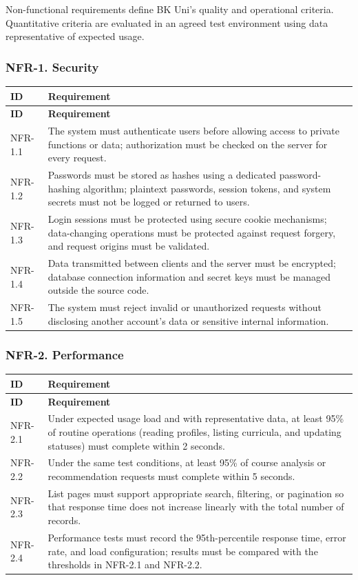 Non-functional requirements define BK Uni's quality and operational criteria. Quantitative criteria are evaluated in an agreed test environment using data representative of expected usage.

\subsubsection{NFR-1. Security}
\begin{longtable}{|p{}|p{}|}
\hline
\textbf{ID} & \textbf{Requirement} \\
\hline
\endfirsthead
\hline
\textbf{ID} & \textbf{Requirement} \\
\hline
\endhead
NFR-1.1 & The system must authenticate users before allowing access to private functions or data; authorization must be checked on the server for every request. \\
\hline
NFR-1.2 & Passwords must be stored as hashes using a dedicated password-hashing algorithm; plaintext passwords, session tokens, and system secrets must not be logged or returned to users. \\
\hline
NFR-1.3 & Login sessions must be protected using secure cookie mechanisms; data-changing operations must be protected against request forgery, and request origins must be validated. \\
\hline
NFR-1.4 & Data transmitted between clients and the server must be encrypted; database connection information and secret keys must be managed outside the source code. \\
\hline
NFR-1.5 & The system must reject invalid or unauthorized requests without disclosing another account's data or sensitive internal information. \\
\hline
\end{longtable}

\subsubsection{NFR-2. Performance}
\begin{longtable}{|p{}|p{}|}
\hline
\textbf{ID} & \textbf{Requirement} \\
\hline
\endfirsthead
\hline
\textbf{ID} & \textbf{Requirement} \\
\hline
\endhead
NFR-2.1 & Under expected usage load and with representative data, at least 95\% of routine operations (reading profiles, listing curricula, and updating statuses) must complete within 2 seconds. \\
\hline
NFR-2.2 & Under the same test conditions, at least 95\% of course analysis or recommendation requests must complete within 5 seconds. \\
\hline
NFR-2.3 & List pages must support appropriate search, filtering, or pagination so that response time does not increase linearly with the total number of records. \\
\hline
NFR-2.4 & Performance tests must record the 95th-percentile response time, error rate, and load configuration; results must be compared with the thresholds in NFR-2.1 and NFR-2.2. \\
\hline
\end{longtable}

